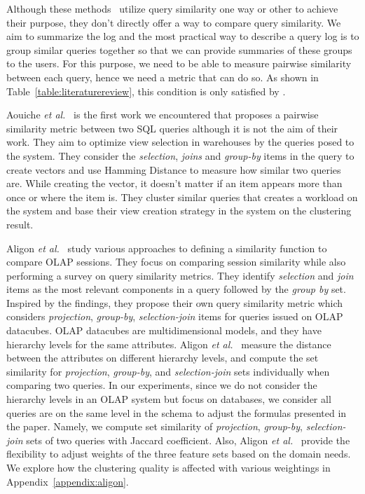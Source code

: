 Although these methods~\cite{agrawal2006context, chatzopoulou2011querie, yang2009, giacometti2009, stefanidis2009you, magda2010snipsuggest} utilize query similarity one way or other to achieve their purpose, they don't directly offer a way to compare query similarity. 
We aim to summarize the log and the most practical way to describe a query log is to group similar queries together so that we can provide summaries of these groups to the users.
For this purpose, we need to be able to measure pairwise similarity between each query, hence we need a metric that can do so. As shown in Table~\ref{table:literaturereview}, this condition is only satisfied by \cite{aouiche2006, aligon2014similarity, makiyama2015text}.

Aouiche \textit{et al.}~\cite{aouiche2006} is the first work we encountered that proposes a pairwise similarity metric between two SQL queries although it is not the aim of their work.
They aim to optimize view selection in warehouses by the queries posed to the system.
They consider the \textit{selection}, \textit{joins} and \textit{group-by} items in the query to create vectors and use Hamming Distance to measure how similar two queries are.
While creating the vector, it doesn't matter if an item appears more than once or where the item is.
They cluster similar queries that creates a workload on the system and base their view creation strategy in the system on the clustering result. 

Aligon \textit{et al.}~\cite{aligon2014similarity} study various approaches to defining a similarity function to compare OLAP sessions.
They focus on comparing session similarity while also performing a survey on query similarity metrics.
They identify \textit{selection} and \textit{join} items as the most relevant components in a query followed by the \textit{group by} set.
Inspired by the findings, they propose their own query similarity metric which considers \textit{projection}, \textit{group-by}, \textit{selection-join} items for queries issued on OLAP datacubes. 
OLAP datacubes are multidimensional models, and they have hierarchy levels for the same attributes. Aligon \textit{et al.}~\cite{aligon2014similarity} measure the distance between the attributes on different hierarchy levels, and compute the set similarity for \textit{projection}, \textit{group-by}, and \textit{selection-join} sets individually when comparing two queries.
In our experiments, since we do not consider the hierarchy levels in an OLAP system but focus on databases, we consider all queries are on the same level in the schema to adjust the formulas presented in the paper. 
Namely, we compute set similarity of \textit{projection}, \textit{group-by}, \textit{selection-join} sets of two queries with Jaccard coefficient. 
Also, Aligon \textit{et al.}~\cite{aligon2014similarity} provide the flexibility to adjust weights of the three feature sets based on the domain needs. We explore how the clustering quality is affected with various weightings in Appendix~\ref{appendix:aligon}.

